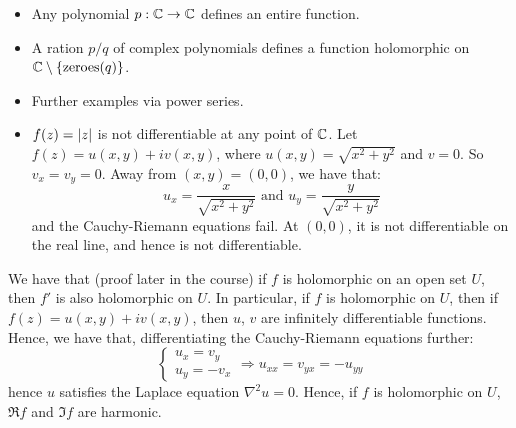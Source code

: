 \begin{itemize}
\item Any polynomial $p : \mathbb{C} \rightarrow \mathbb{C}$ defines an entire function.
\item A ration $p/q$ of complex polynomials defines a function holomorphic on $\mathbb{C} \setminus \{ \text{zeroes} (q) \}$.
\item Further examples via power series.
\item $f(z) = \lvert z\rvert$ is not differentiable at any point of $\mathbb{C}$. Let $f(z) = u(x, y) + iv(x, y)$, where $u(x, y) = \sqrt{x^2 + y^2}$ and $v = 0$. So $v_x = v_y = 0$. Away from $(x, y) = (0, 0)$, we have that:
\[
u_x = \frac{x}{\sqrt{x^2 + y^2}} \text{ and } u_y = \frac{y}{\sqrt{x^2 + y^2}}
\]
and the Cauchy-Riemann equations fail. At $(0, 0)$, it is not differentiable on the real line, and hence is not differentiable.
\end{itemize}

We have that (proof later in the course) if $f$ is holomorphic on an open set $U$, then $f'$ is also holomorphic on $U$. In particular, if $f$ is holomorphic on $U$, then if $f(z) = u(x, y) + iv(x, y)$, then $u$, $v$ are infinitely differentiable functions. Hence, we have that, differentiating the Cauchy-Riemann equations further:
\[
\begin{cases}
u_x = v_y \\
u_y = -v_x
\end{cases}
\Rightarrow u_{xx} = v_{yx} = -u_{yy}
\]
hence $u$ satisfies the Laplace equation $\nabla^2u = 0$. Hence, if $f$ is holomorphic on $U$, $\Re{f}$ and $\Im{f}$ are harmonic.

